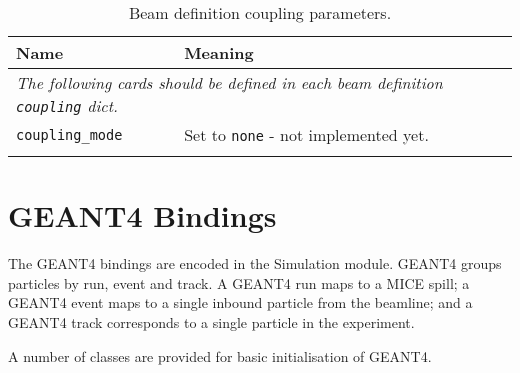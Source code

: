 \begin{table*}
\begin{center}
\caption{Beam definition coupling parameters.}
\begin{tabularx}{\linewidth}{lX}
Name & Meaning \\
\hline
\multicolumn{2}{l}{\emph{The following cards should be defined in each beam definition \verb|coupling| dict.}} \\
\hline
\verb|coupling_mode| & Set to \verb|none| - not implemented yet. \\
\begin{makeimage} %
\end{makeimage} 
\end{tabularx}
\end{center}
\end{table*}

\section{GEANT4 Bindings}
The GEANT4 bindings are encoded in the Simulation module. GEANT4 groups particles by run, event and track. A GEANT4 run maps to a MICE spill; a GEANT4 event maps to a single inbound particle from the beamline; and a GEANT4 track corresponds to a single particle in the experiment.

A number of classes are provided for basic initialisation of GEANT4.

